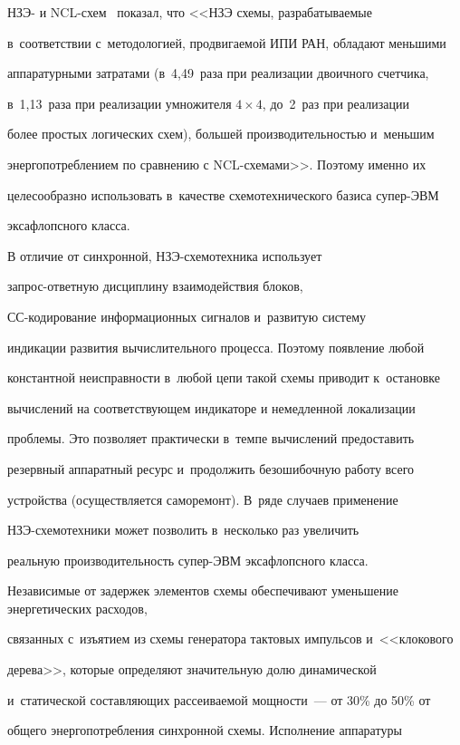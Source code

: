 НЗЭ- и NCL-схем~\cite{13-st1} показал, что <<НЗЭ схемы, разрабатываемые

в~соответствии с~методологией, продвигаемой ИПИ РАН, обладают меньшими

аппаратурными затратами (в~4,49~раза при реализации двоичного счетчика,

в~1,13~раза при реализации умножителя $4\times4$, до~2~раз при реализации

более простых логических схем), большей производительностью и~меньшим

энергопотреблением по сравнению с NCL-схе\-ма\-ми>>. Поэтому именно их

целесообразно использовать в~качестве схемотехнического базиса су\-пер-ЭВМ

эксафлопсного класса.



      В отличие от синхронной, НЗЭ-схемотехника использует

      запрос-от\-вет\-ную дисциплину взаимодействия блоков,

      СС-ко\-ди\-ро\-ва\-ние информационных сигналов и~развитую систему

индикации развития вычислительного процесса. Поэтому появление любой

константной неисправности в~любой цепи такой схемы приводит к~остановке

вычислений на соответствующем индикаторе и немедленной локализации

проб\-ле\-мы. Это позволяет практически в~темпе вычислений предоставить

резервный аппаратный ресурс и~продолжить безошибочную работу всего

устройства (осуществляется саморемонт). В~ряде случаев применение

      НЗЭ-схе\-мо\-тех\-ни\-ки может позволить в~несколько раз увеличить

реальную производительность су\-пер-ЭВМ эксафлопсного класса.



      Независимые от задержек элементов схемы обеспечивают уменьшение энергетических расходов,

связанных с~изъятием из схемы генератора тактовых импульсов и~<<клокового

дерева>>, которые определяют значительную долю динамической

и~статической составляющих рассеиваемой мощности~--- от 30\% до 50\% от

общего энергопотребления синхронной схемы. Исполнение аппаратуры

